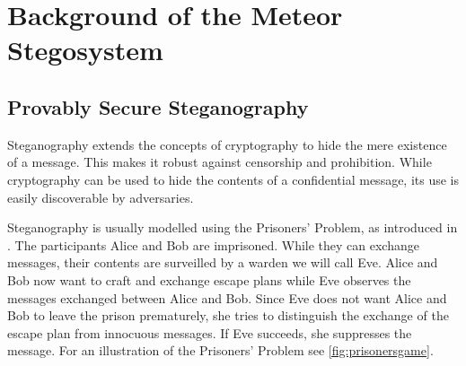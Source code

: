 \chapter{Background of the Meteor Stegosystem}
\label{chap:previous-work}

\section{Provably Secure Steganography}
\label{sec:prov-sec-steg}

Steganography extends the concepts of cryptography to hide the mere existence of a message.
This makes it robust against censorship and prohibition.
While cryptography can be used to hide the contents of a confidential message, its use is easily discoverable by adversaries.


Steganography is usually modelled using the Prisoners' Problem, as introduced in \cite{Simmons1983}.
The participants Alice and Bob are imprisoned.
While they can exchange messages, their contents are surveilled by a warden we will call Eve.
Alice and Bob now want to craft and exchange escape plans while Eve observes the messages exchanged between Alice and Bob.
Since Eve does not want Alice and Bob to leave the prison prematurely, she tries to distinguish the exchange of the escape plan from innocuous messages.
If Eve succeeds, she suppresses the message.
For an illustration of the Prisoners' Problem see \autoref{fig:prisonersgame}.

